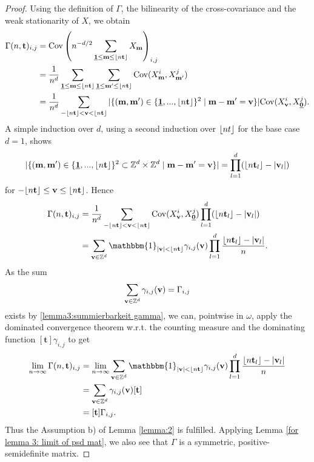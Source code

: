\begin{proof}
    Using the definition of $\Gamma$, the bilinearity of the cross-covariance and the weak stationarity of $X$, we obtain
    \begin{equation*}\begin{split}
        \Gamma(n, \mathbf{t})_{i, j}
        & = \Cov\left(n^{-d/2} \sum\limits_{\usbf[1] \leq \mathbf{m} \leq \floor{n \mathbf{t}}} X_\mathbf{m} \right)_{i, j} \\
        & = \frac{1}{n^{d}} \sum\limits_{\usbf[1] \leq \mathbf{m} \leq \floor{n \mathbf{t}}}  \sum\limits_{\usbf[1] \leq \mathbf{m}' \leq \floor{n \mathbf{t}}}  \Cov(X_{\mathbf{m}}^{i}, X_{\mathbf{m}'}^j) \\
        & = \frac{1}{n^{d}} \sum\limits_{-\floor{n \mathbf{t}} < \mathbf{v} < \floor{n \mathbf{t}}} |\{ (\mathbf{m}, \mathbf{m}') \in \{ \usbf[1], ..., \floor{n \mathbf{t}} \}^2 \mid \mathbf{m} - \mathbf{m}' = \mathbf{v} \}| \Cov(X_\mathbf{v}^i, X_{\usbf[0]}^j).
    \end{split}\end{equation*}
    A simple induction over $d$, using a second induction over $\lfloor n t\rfloor$ for the base case $d=1$, shows
    \[ |\{ (\mathbf{m}, \mathbf{m}') \in \{ \usbf[1], ..., \floor{n \mathbf{t}} \}^2 \subset \ZZ^d \times \ZZ^d \mid \mathbf{m} - \mathbf{m}' = \mathbf{v} \}| = \prod\limits_{l=1}^d (\floor{n \mathbf{t}_l} - |\mathbf{v}_l|) \]
    for $-\lfloor n \mathbf{t}\rfloor \leq \mathbf{v} \leq \lfloor n \mathbf{t}\rfloor$. Hence
    \begin{align*}
        \Gamma(n, \mathbf{t})_{i, j}
        & = \frac{1}{n^{d}} \sum\limits_{-\floor{n \mathbf{t}} < \mathbf{v} < \floor{n \mathbf{t}}} \Cov(X_\mathbf{v}^i, X_{\usbf[0]}^j) \prod\limits_{l=1}^d (\floor{n \mathbf{t}_l} - |\mathbf{v}_l|) \\
        & = \sum\limits_{\mathbf{v} \in \ZZ^d} \mathbbm{1}_{|\mathbf{v}| < \floor{n \mathbf{t}}} \gamma_{i, j}(\mathbf{v}) \prod\limits_{l=1}^d \frac{\floor{n \mathbf{t}_l} - |\mathbf{v}_l|}{n}.
    \end{align*}
    As the sum
    \begin{align*}
        \sum\limits_{\mathbf{v} \in \mathbb{Z}^d} \gamma_{i, j}(\mathbf{v}) = \Gamma_{i, j}
    \end{align*}
    exists by \eqref{lemma3:summierbarkeit gamma}, we can, pointwise in $\omega$, apply the dominated convergence theorem w.r.t. the counting measure and the dominating function $[\mathbf{t}]\gamma_{i, j}$ to get
    \begin{align*}
            \lim\limits_{n \to \infty} \Gamma(n, \mathbf{t})_{i, j}
            & = \lim\limits_{n \to \infty} \sum\limits_{\mathbf{v} \in \ZZ^d} \mathbbm{1}_{|\mathbf{v}| < \floor{n \mathbf{t}}} \gamma_{i, j}(\mathbf{v}) \prod\limits_{l=1}^d \frac{\floor{n \mathbf{t}_l} - |\mathbf{v}_l|}{n} \\
            & = \sum\limits_{\mathbf{v} \in \ZZ^d} \gamma_{i, j}(\mathbf{v}) [\mathbf{t}] \\
            & = [\mathbf{t}] \Gamma_{i, j}.
    \end{align*}
    Thus the Assumption b) of Lemma \ref{lemma:2} is fulfilled. Applying Lemma \ref{for lemma 3: limit of psd mat}, we also see that $\Gamma$ is a symmetric, positive-semidefinite matrix. 


\end{proof}

